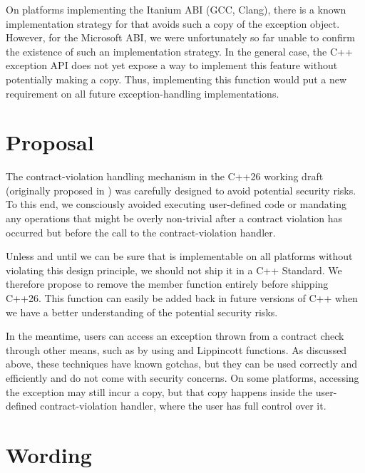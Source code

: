 On platforms implementing the Itanium ABI (GCC, Clang), there is a known implementation strategy for    that avoids such a copy of the exception object. However, for the Microsoft ABI, we were unfortunately so far unable to confirm the existence of such an implementation strategy. In the general case, the C++ exception API does not yet expose a way to implement this feature without potentially making a copy. Thus, implementing this function would put a new requirement on all future exception-handling implementations.

\section{Proposal}

The contract-violation handling mechanism in the C++26 working draft (originally proposed in \cite{P2811R7}) was carefully designed to avoid potential security risks. To this end, we consciously avoided executing user-defined code or mandating any operations that might be overly non-trivial after a contract violation has occurred but before the call to the contract-violation handler.

Unless and until we can be sure that  is implementable on all platforms without violating this design principle, we should not ship it in a C++ Standard. We therefore propose to remove the member function  entirely before shipping C++26. This function can easily be added back in future versions of C++ when we have a better understanding of the potential security risks.

In the meantime, users can access an exception thrown from a contract check through other means, such as by using  and Lippincott functions. As discussed above, these techniques have known gotchas, but they can be used correctly and efficiently and do not come with security concerns. On some platforms, accessing the exception may still incur a copy, but that copy happens inside the user-defined contract-violation handler, where the user has full control over it.

\section{Wording}


